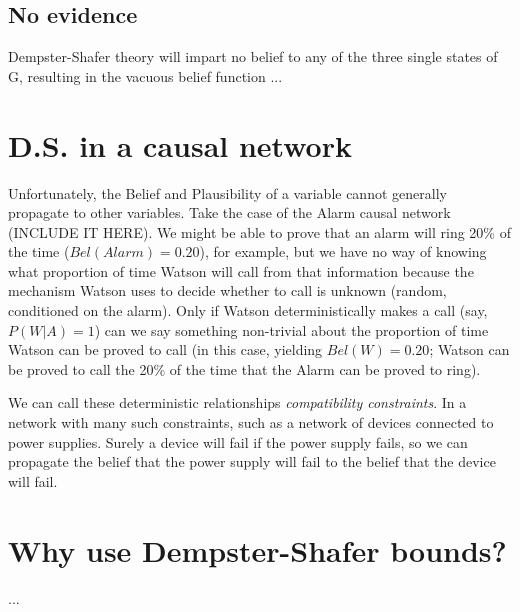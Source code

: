 \documentclass[letterpaper]{article}
\begin{document}
\subsection{No evidence}

Dempster-Shafer theory will impart no belief to any of the three single states of G, resulting in the vacuous belief function
...


\section{D.S. in a causal network}
Unfortunately, the Belief and Plausibility of a variable cannot generally propagate to other variables.  Take the case of the Alarm causal network (INCLUDE IT HERE).  We might be able to prove that an alarm will ring 20\% of the time ($Bel({Alarm})=0.20$), for example, but we have no way of knowing what proportion of time Watson will call from that information because the mechanism Watson uses to decide whether to call is unknown (random, conditioned on the alarm).  Only if Watson deterministically makes a call (say, $P(W|A) = 1$) can we say something non-trivial about the proportion of time Watson can be proved to call (in this case, yielding $Bel(W) = 0.20$; Watson can be proved to call the 20\% of the time that the Alarm can be proved to ring).

We can call these deterministic relationships \textit{compatibility constraints}.  In a network with many such constraints, such as a network of devices connected to power supplies.  Surely a device will fail if the power supply fails, so we can propagate the belief that the power supply will fail to the belief that the device will fail.


\section{Why use Dempster-Shafer bounds?}
...
\end{document}
